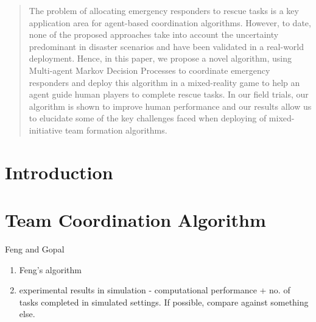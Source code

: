 \documentclass{aamas2014}
\begin{document}
\begin{abstract}
The problem of allocating emergency responders to rescue tasks is a key application area for agent-based coordination algorithms. However, to date, none of the proposed approaches take into account the uncertainty predominant in disaster scenarios and have been validated in a real-world deployment. Hence, in this paper, we propose a novel algorithm, using Multi-agent Markov Decision Processes to coordinate emergency responders and deploy this algorithm in a mixed-reality game to help an agent guide human players to complete rescue tasks. In our field trials, our algorithm is shown to improve human performance and our results allow us to elucidate some of the key challenges faced when  deploying of mixed-initiative team formation algorithms. \end{abstract}








\section{Introduction}



\section{Team Coordination Algorithm}
Feng and Gopal
\begin{enumerate}
\item Feng's algorithm
\item experimental results in simulation - computational performance + no. of tasks completed in simulated settings. If possible, compare against something else.
\end{enumerate}
\end{document}
